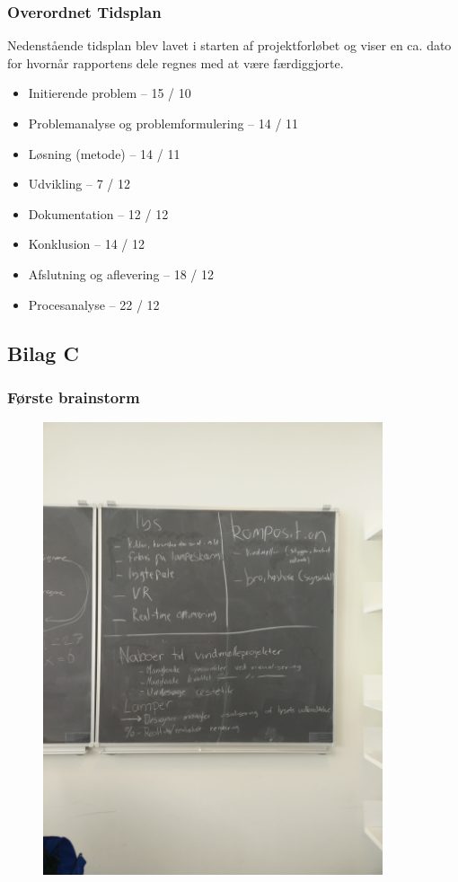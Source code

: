 \documentclass[oneside,a4paper,titlepage]{article}
\begin{document}
\subsubsection*{Overordnet Tidsplan}
\label{sec:tidsplan}
Nedenstående tidsplan blev lavet i starten af projektforløbet og viser en ca. dato for hvornår rapportens dele regnes med at være færdiggjorte.

\begin{itemize}
\item Initierende problem – 15 / 10
\item Problemanalyse og problemformulering – 14 / 11
\item Løsning (metode) – 14 / 11
\item Udvikling – 7 / 12
\item Dokumentation – 12 / 12
\item Konklusion – 14 / 12
\item Afslutning og aflevering – 18 / 12
\item Procesanalyse – 22 / 12
\end{itemize}

\subsection{Bilag C}

\subsubsection*{Første brainstorm}
\label{sec:brainstorm}

\begin{figure}[H]
   \centering
   \includegraphics[width=10cm]{./../graphics/brainstorm_1}
\end{figure}
\end{document}
